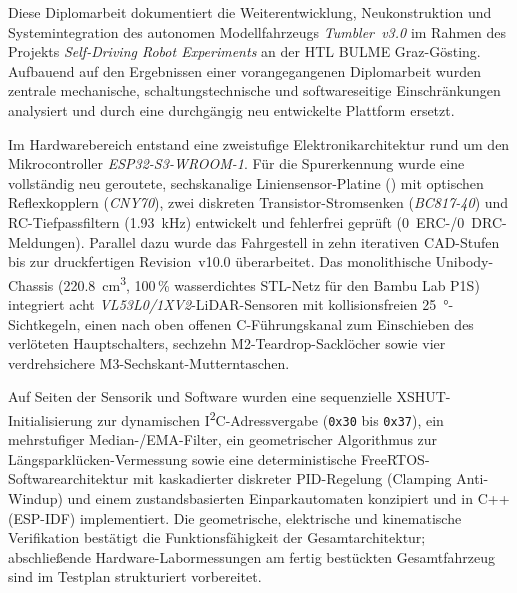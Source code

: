 Diese Diplomarbeit dokumentiert die Weiterentwicklung, Neukonstruktion und Systemintegration des autonomen Modellfahrzeugs \emph{Tumbler~v3.0} im Rahmen des Projekts \emph{Self-Driving Robot Experiments} an der HTL BULME Graz-Gösting. Aufbauend auf den Ergebnissen einer vorangegangenen Diplomarbeit wurden zentrale mechanische, schaltungstechnische und softwareseitige Einschränkungen analysiert und durch eine durchgängig neu entwickelte Plattform ersetzt.

Im Hardwarebereich entstand eine zweistufige Elektronikarchitektur rund um den Mikrocontroller \emph{ESP32-S3-WROOM-1}. Für die Spurerkennung wurde eine vollständig neu geroutete, sechskanalige Liniensensor-Platine () mit optischen Reflexkopplern (\emph{CNY70}), zwei diskreten Transistor-Stromsenken (\emph{BC817-40}) und RC-Tiefpassfiltern (\qty{1,93}{\kilo\hertz}) entwickelt und fehlerfrei geprüft (0~ERC-/0~DRC-Meldungen). Parallel dazu wurde das Fahrgestell in zehn iterativen CAD-Stufen bis zur druckfertigen Revision~v10.0 überarbeitet. Das monolithische Unibody-Chassis (\qty{220,8}{\centi\meter\cubed}, 100\,\% wasserdichtes STL-Netz für den Bambu Lab P1S) integriert acht \emph{VL53L0/1XV2}-LiDAR-Sensoren mit kollisionsfreien \qty{25}{\degree}-Sichtkegeln, einen nach oben offenen C-Führungskanal zum Einschieben des verlöteten Hauptschalters, sechzehn M2-Teardrop-Sacklöcher sowie vier verdrehsichere M3-Sechskant-Mutterntaschen.

Auf Seiten der Sensorik und Software wurden eine sequenzielle XSHUT-Initialisierung zur dynamischen I\textsuperscript{2}C-Adressvergabe (\texttt{0x30} bis \texttt{0x37}), ein mehrstufiger Median-/EMA-Filter, ein geometrischer Algorithmus zur Längsparklücken-Vermessung sowie eine deterministische FreeRTOS-Softwarearchitektur mit kaskadierter diskreter PID-Regelung (Clamping Anti-Windup) und einem zustandsbasierten Einparkautomaten konzipiert und in C++ (ESP-IDF) implementiert. Die geometrische, elektrische und kinematische Verifikation bestätigt die Funktionsfähigkeit der Gesamtarchitektur; abschließende Hardware-Labormessungen am fertig bestückten Gesamtfahrzeug sind im Testplan strukturiert vorbereitet.
